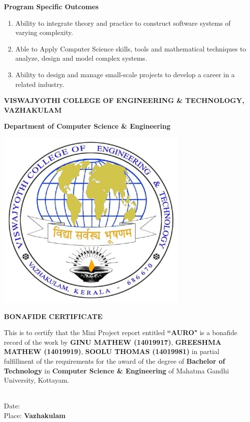 \documentclass[a4 paper,11pt]{report}
\begin{document}
\begin{center}
\textbf{Program Specific Outcomes}
\end{center}
\begin{enumerate}
\item Ability to integrate theory and practice to construct software systems of varying complexity.
\item Able to Apply Computer Science skills, tools and mathematical techniques to analyze, design and model complex systems.
\item Ability to design and manage small-scale projects to develop a career in a related industry.
\end{enumerate}

\newpage
\thispagestyle{empty}
    \begin{center}
        
        \large
        \textbf{VISWAJYOTHI COLLEGE OF ENGINEERING \& TECHNOLOGY, VAZHAKULAM}
        
        \large \textbf{Department of Computer Science \& Engineering }
        
		\vspace{0.1cm}        
        
        \includegraphics[width=.25\textwidth]{vjcet.jpg}
        
        \large \textbf{BONAFIDE CERTIFICATE}
        \vspace{0.2cm}
    \end{center}
This is to certify that the Mini Project report entitled \textbf{``AURO"} is a bonafide record of the work by \textbf{GINU MATHEW (14019917)}, \textbf{GREESHMA MATHEW (14019919)}, \textbf{SOOLU THOMAS (14019981)} in partial fulfillment of the requirements for the award of the degree of \textbf{Bachelor of Technology} in \textbf{Computer Science \& Engineering} of Mahatma Gandhi University, Kottayam.
\\ \\
\begin{minipage}{.6\textwidth}
	\begin{flushleft} 
		Date: \underline{\hspace{2.5cm}}\\
		Place: \textbf{Vazhakulam}\\
	\end{flushleft}
\end{minipage}
\end{document}
